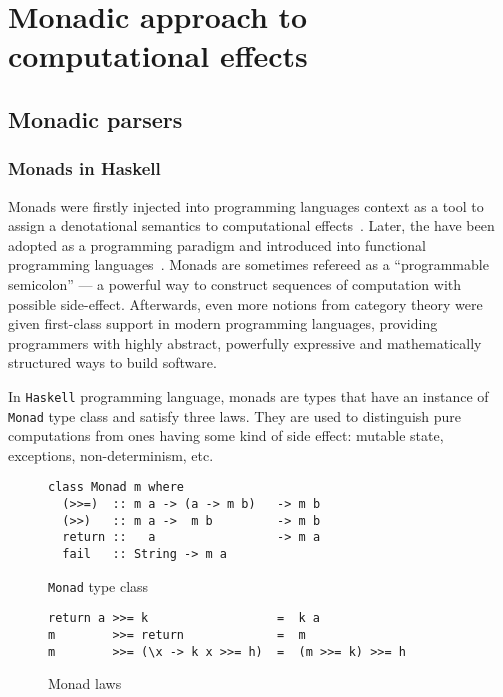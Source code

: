 \chapter{Monadic approach to computational effects}
\label{cpt-parsers}

  \section{Monadic parsers}
  \label{cpt-parsers:monadic}

    \subsection{Monads in Haskell}
      Monads were firstly injected into programming languages context as a tool to
      assign a denotational semantics to computational effects~\cite{Moggi:1991:NCM:116981.116984}. Later, the have been adopted as a programming
      paradigm and introduced into functional programming languages~\cite{Wadler:1992:EFP:143165.143169}. Monads are sometimes refereed as a ``programmable semicolon'' --- a powerful way to construct sequences of computation with possible side-effect. Afterwards, even more notions from category theory were given first-class support in modern programming languages, providing programmers with highly abstract, powerfully expressive and mathematically structured ways to build software.

      In \texttt{Haskell} programming language, monads are types that have an instance of \texttt{Monad} type class and satisfy three laws. They are used
      to distinguish pure computations from ones having some kind of side effect:
      mutable state, exceptions, non-determinism, etc.

      \begin{figure}[h]
      \begin{lstlisting}
class Monad m where
  (>>=)  :: m a -> (a -> m b)   -> m b
  (>>)   :: m a ->  m b         -> m b
  return ::   a                 -> m a
  fail   :: String -> m a
      \end{lstlisting}
      \caption{\texttt{Monad} type class}
      \label{listing:monadClass}
      \end{figure}

      \begin{figure}[h]
      \begin{lstlisting}
return a >>= k                  =  k a
m        >>= return             =  m
m        >>= (\x -> k x >>= h)  =  (m >>= k) >>= h
      \end{lstlisting}
      \caption{Monad laws}
      \label{listing:monadLaws}
      \end{figure}

